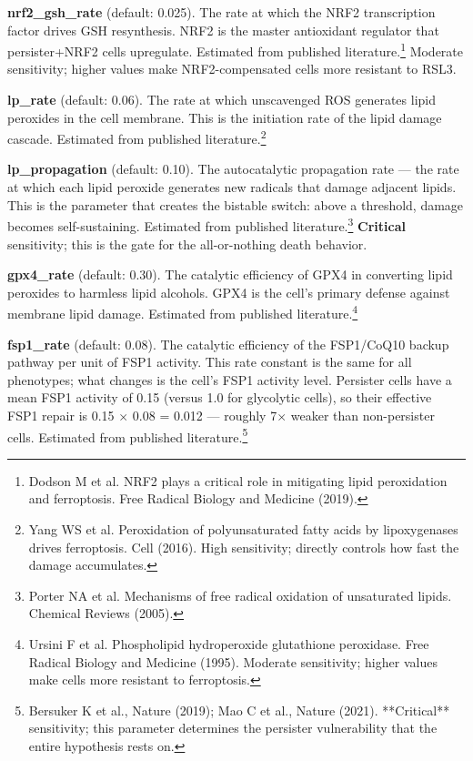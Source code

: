 \documentclass[11pt,twoside,openright]{report}
\begin{document}
\textbf{nrf2\_gsh\_rate} (default: 0.025). The rate at which the NRF2 transcription factor drives GSH resynthesis. NRF2 is the master antioxidant regulator that persister+NRF2 cells upregulate. Estimated from published literature.\footnote{Dodson M et al. NRF2 plays a critical role in mitigating lipid peroxidation and ferroptosis. Free Radical Biology and Medicine (2019).} Moderate sensitivity; higher values make NRF2-compensated cells more resistant to RSL3.

\textbf{lp\_rate} (default: 0.06). The rate at which unscavenged ROS generates lipid peroxides in the cell membrane. This is the initiation rate of the lipid damage cascade. Estimated from published literature.\footnote{Yang WS et al. Peroxidation of polyunsaturated fatty acids by lipoxygenases drives ferroptosis. Cell (2016). High sensitivity; directly controls how fast the damage accumulates.}

\textbf{lp\_propagation} (default: 0.10). The autocatalytic propagation rate --- the rate at which each lipid peroxide generates new radicals that damage adjacent lipids. This is the parameter that creates the bistable switch: above a threshold, damage becomes self-sustaining. Estimated from published literature.\footnote{Porter NA et al. Mechanisms of free radical oxidation of unsaturated lipids. Chemical Reviews (2005).} \textbf{Critical} sensitivity; this is the gate for the all-or-nothing death behavior.

\textbf{gpx4\_rate} (default: 0.30). The catalytic efficiency of GPX4 in converting lipid peroxides to harmless lipid alcohols. GPX4 is the cell's primary defense against membrane lipid damage. Estimated from published literature.\footnote{Ursini F et al. Phospholipid hydroperoxide glutathione peroxidase. Free Radical Biology and Medicine (1995). Moderate sensitivity; higher values make cells more resistant to ferroptosis.}

\textbf{fsp1\_rate} (default: 0.08). The catalytic efficiency of the FSP1/CoQ10 backup pathway per unit of FSP1 activity. This rate constant is the same for all phenotypes; what changes is the cell's FSP1 activity level. Persister cells have a mean FSP1 activity of 0.15 (versus 1.0 for glycolytic cells), so their effective FSP1 repair is 0.15 $\times$ 0.08 = 0.012 --- roughly 7$\times$ weaker than non-persister cells. Estimated from published literature.\footnote{Bersuker K et al., Nature (2019); Mao C et al., Nature (2021). **Critical** sensitivity; this parameter determines the persister vulnerability that the entire hypothesis rests on.}
\end{document}
